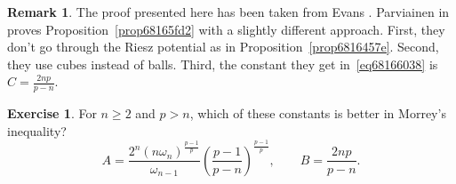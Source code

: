 \documentclass[a4paper,9pt]{amsart}
\theoremstyle{plain}
\theoremstyle{definition}
\newtheorem{remark}[proposition]{Remark}
\newtheorem{exercise}[proposition]{Exercise}%
\theoremstyle{remark}
\begin{document}
\begin{remark}\label{rem6816609d}
	The proof presented here has been taken from Evans \cite[\S5.6.2]{MR2597943}.
	Parviainen in \cite{Parviainen} proves Proposition~\ref{prop68165fd2} with a slightly different approach. 
	First, they don't go through the Riesz potential as in Proposition~\ref{prop6816457e}.
	Second, they use cubes instead of balls.
	Third, the constant they get in~\eqref{eq68166038} is $C=\frac{2np}{p-n}$.
\end{remark}

\begin{exercise}
	For $n\ge2$ and $p>n$, which of these constants is better in Morrey's inequality?
	\begin{equation}
		A = \frac{ 2^n (n\omega_n)^{\frac{p-1}{p}} }{ \omega_{n-1} } \left(\frac{p-1}{p-n}\right)^{\frac{p-1}{p}},
		\qquad
		B = \frac{2np}{p-n} .
	\end{equation}
\end{exercise}
\end{document}
